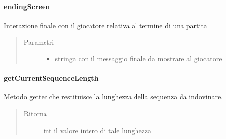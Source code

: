 \documentclass[letterpaper,10pt,italian,openany,oneside]{sphinxmanual}
\begin{document}
\paragraph{endingScreen}
\label{\detokenize{source/it/unicam/cs/pa/mastermind/ui/InteractionView:endingscreen}}

\begin{fulllineitems}
\label{\detokenize{source/it/unicam/cs/pa/mastermind/ui/InteractionView:it.unicam.cs.pa.mastermind.ui.InteractionView.endingScreen(String)}}
Interazione finale con il giocatore relativa al termine di una partita
\begin{quote}\begin{description}
\item[{Parametri}] \leavevmode\begin{itemize}
\item {} 
 \textendash{} stringa con il messaggio finale da mostrare al giocatore

\end{itemize}

\end{description}\end{quote}

\end{fulllineitems}



\paragraph{getCurrentSequenceLength}
\label{\detokenize{source/it/unicam/cs/pa/mastermind/ui/InteractionView:getcurrentsequencelength}}

\begin{fulllineitems}
\label{\detokenize{source/it/unicam/cs/pa/mastermind/ui/InteractionView:it.unicam.cs.pa.mastermind.ui.InteractionView.getCurrentSequenceLength()}}
Metodo getter che restituisce la lunghezza della sequenza da indovinare.
\begin{quote}\begin{description}
\item[{Ritorna}] \leavevmode
int il valore intero di tale lunghezza

\end{description}\end{quote}

\end{fulllineitems}
\end{document}
